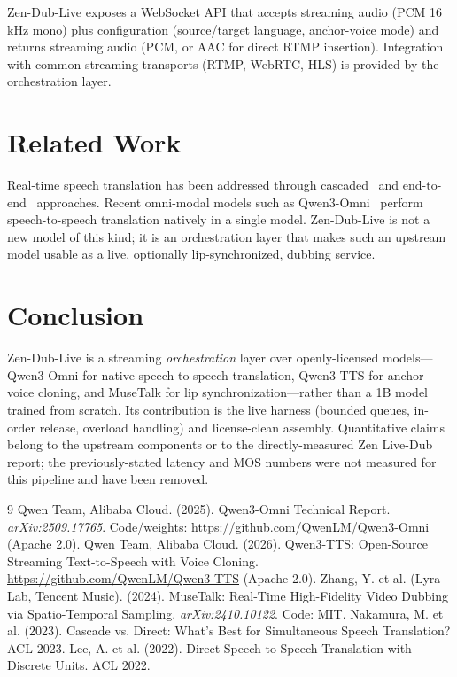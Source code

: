 \documentclass[11pt,a4paper]{article}
\begin{document}
Zen-Dub-Live exposes a WebSocket API that accepts streaming audio (PCM 16\,kHz mono)
plus configuration (source/target language, anchor-voice mode) and returns streaming
audio (PCM, or AAC for direct RTMP insertion). Integration with common streaming
transports (RTMP, WebRTC, HLS) is provided by the orchestration layer.

\section{Related Work}

Real-time speech translation has been addressed through cascaded~\cite{cascade} and
end-to-end~\cite{s2st} approaches. Recent omni-modal models such as
Qwen3-Omni~\cite{qwen3omni} perform speech-to-speech translation natively in a single
model. Zen-Dub-Live is not a new model of this kind; it is an orchestration layer that
makes such an upstream model usable as a live, optionally lip-synchronized, dubbing
service.

\section{Conclusion}

Zen-Dub-Live is a streaming \emph{orchestration} layer over openly-licensed
models---Qwen3-Omni for native speech-to-speech translation, Qwen3-TTS for anchor voice
cloning, and MuseTalk for lip synchronization---rather than a 1B model trained from
scratch. Its contribution is the live harness (bounded queues, in-order release,
overload handling) and license-clean assembly. Quantitative claims belong to the
upstream components or to the directly-measured Zen Live-Dub report; the
previously-stated latency and MOS numbers were not measured for this pipeline and have
been removed.

\begin{thebibliography}{9}
 Qwen Team, Alibaba Cloud. (2025). Qwen3-Omni Technical Report. \textit{arXiv:2509.17765}. Code/weights: \url{https://github.com/QwenLM/Qwen3-Omni} (Apache 2.0).
 Qwen Team, Alibaba Cloud. (2026). Qwen3-TTS: Open-Source Streaming Text-to-Speech with Voice Cloning. \url{https://github.com/QwenLM/Qwen3-TTS} (Apache 2.0).
 Zhang, Y. et al. (Lyra Lab, Tencent Music). (2024). MuseTalk: Real-Time High-Fidelity Video Dubbing via Spatio-Temporal Sampling. \textit{arXiv:2410.10122}. Code: MIT.
 Nakamura, M. et al. (2023). Cascade vs. Direct: What's Best for Simultaneous Speech Translation? ACL 2023.
 Lee, A. et al. (2022). Direct Speech-to-Speech Translation with Discrete Units. ACL 2022.
\end{thebibliography}
\end{document}
